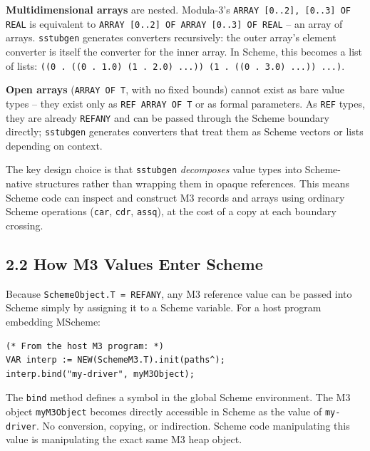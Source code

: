 \documentclass[
  12pt,
]{report}
\newcommand{\passthrough}[1]{#1}
\begin{document}
\textbf{Multidimensional arrays} are nested. Modula-3's
\passthrough{\lstinline!ARRAY [0..2], [0..3] OF REAL!} is equivalent to
\passthrough{\lstinline!ARRAY [0..2] OF ARRAY [0..3] OF REAL!} -- an
array of arrays. \passthrough{\lstinline!sstubgen!} generates converters
recursively: the outer array's element converter is itself the converter
for the inner array. In Scheme, this becomes a list of lists:
\passthrough{\lstinline!((0 . ((0 . 1.0) (1 . 2.0) ...)) (1 . ((0 . 3.0) ...)) ...)!}.

\textbf{Open arrays} (\passthrough{\lstinline!ARRAY OF T!}, with no
fixed bounds) cannot exist as bare value types -- they exist only as
\passthrough{\lstinline!REF ARRAY OF T!} or as formal parameters. As
\passthrough{\lstinline!REF!} types, they are already
\passthrough{\lstinline!REFANY!} and can be passed through the Scheme
boundary directly; \passthrough{\lstinline!sstubgen!} generates
converters that treat them as Scheme vectors or lists depending on
context.

The key design choice is that \passthrough{\lstinline!sstubgen!}
\emph{decomposes} value types into Scheme-native structures rather than
wrapping them in opaque references. This means Scheme code can inspect
and construct M3 records and arrays using ordinary Scheme operations
(\passthrough{\lstinline!car!}, \passthrough{\lstinline!cdr!},
\passthrough{\lstinline!assq!}), at the cost of a copy at each boundary
crossing.

\subsection{2.2 How M3 Values Enter
Scheme}\label{how-m3-values-enter-scheme}

Because \passthrough{\lstinline!SchemeObject.T = REFANY!}, any M3
reference value can be passed into Scheme simply by assigning it to a
Scheme variable. For a host program embedding MScheme:

\begin{lstlisting}
(* From the host M3 program: *)
VAR interp := NEW(SchemeM3.T).init(paths^);
interp.bind("my-driver", myM3Object);
\end{lstlisting}

The \passthrough{\lstinline!bind!} method defines a symbol in the global
Scheme environment. The M3 object \passthrough{\lstinline!myM3Object!}
becomes directly accessible in Scheme as the value of
\passthrough{\lstinline!my-driver!}. No conversion, copying, or
indirection. Scheme code manipulating this value is manipulating the
exact same M3 heap object.
\end{document}

